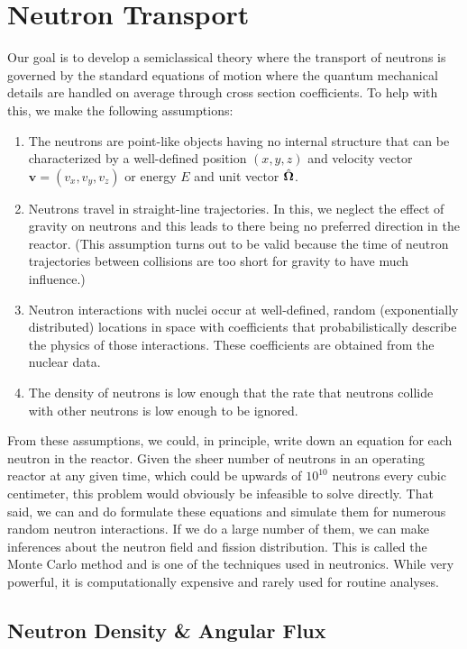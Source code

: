 \section{Neutron Transport}

Our goal is to develop a semiclassical theory where the transport of neutrons is governed by the standard equations of motion where the quantum mechanical details are handled on average through cross section coefficients. To help with this, we make the following assumptions:
\begin{enumerate}
  \item The neutrons are point-like objects having no internal structure that can be characterized by a well-defined position $(x,y,z)$ and velocity vector $\mathbf{v} = ( v_x, v_y, v_z )$ or energy $E$ and unit vector $\hat{\mathbf{\Omega}}$.
  \item Neutrons travel in straight-line trajectories. In this, we neglect the effect of gravity on neutrons and this leads to there being no preferred direction in the reactor. (This assumption turns out to be valid because the time of neutron trajectories between collisions are too short for gravity to have much influence.)
  \item Neutron interactions with nuclei occur at well-defined, random (exponentially distributed) locations in space with coefficients that probabilistically describe the physics of those interactions. These coefficients are obtained from the nuclear data.
  \item The density of neutrons is low enough that the rate that neutrons collide with other neutrons is low enough to be ignored.
\end{enumerate}
From these assumptions, we could, in principle, write down an equation for each neutron in the reactor. Given the sheer number of neutrons in an operating reactor at any given time, which could be upwards of $10^{10}$ neutrons every cubic centimeter, this problem would obviously be infeasible to solve directly. That said, we can and do formulate these equations and simulate them for numerous random neutron interactions. If we do a large number of them, we can make inferences about the neutron field and fission distribution. This is called the Monte Carlo method and is one of the techniques used in neutronics. While very powerful, it is computationally expensive and rarely used for routine analyses.

\subsection{Neutron Density \& Angular Flux}

